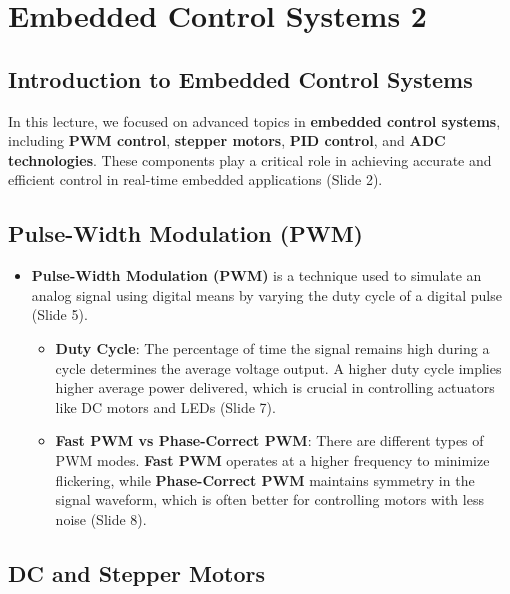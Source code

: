 \documentclass[
  14pt,
  a4paper,
  numbers=noendperiod,
  headinclude=true,
  footinclude=true,
  DIV=calc]{scrreprt}
\begin{document}
\chapter{Embedded Control Systems 2}\label{embedded-control-systems-2}

\section{Introduction to Embedded Control
Systems}\label{introduction-to-embedded-control-systems-1}

In this lecture, we focused on advanced topics in \textbf{embedded
control systems}, including \textbf{PWM control}, \textbf{stepper
motors}, \textbf{PID control}, and \textbf{ADC technologies}. These
components play a critical role in achieving accurate and efficient
control in real-time embedded applications (Slide 2).

\section{Pulse-Width Modulation (PWM)}\label{pulse-width-modulation-pwm}

\begin{itemize}
\item
  \textbf{Pulse-Width Modulation (PWM)} is a technique used to simulate
  an analog signal using digital means by varying the duty cycle of a
  digital pulse (Slide 5).

  \begin{itemize}
  \item
    \textbf{Duty Cycle}: The percentage of time the signal remains high
    during a cycle determines the average voltage output. A higher duty
    cycle implies higher average power delivered, which is crucial in
    controlling actuators like DC motors and LEDs (Slide 7).
  \item
    \textbf{Fast PWM vs Phase-Correct PWM}: There are different types of
    PWM modes. \textbf{Fast PWM} operates at a higher frequency to
    minimize flickering, while \textbf{Phase-Correct PWM} maintains
    symmetry in the signal waveform, which is often better for
    controlling motors with less noise (Slide 8).
  \end{itemize}
\end{itemize}

\section{DC and Stepper Motors}\label{dc-and-stepper-motors}
\end{document}
